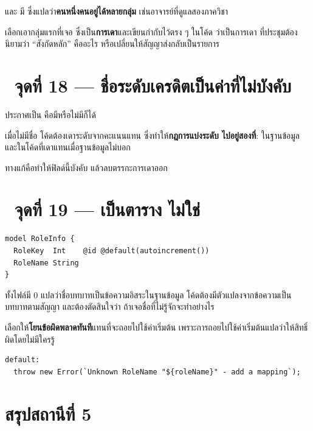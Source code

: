 และ  มี 
ซึ่งแปลว่า\textbf{คนหนึ่งคนอยู่ได้หลายกลุ่ม} เช่นอาจารย์ที่ดูแลสองภาควิชา

 เลือกเอากลุ่มแรกที่เจอ ซึ่งเป็น\textbf{การเดา}และเขียนกำกับไว้ตรง ๆ ในโค้ด
ว่าเป็นการเดา ที่ประชุมต้องนิยามว่า ``สังกัดหลัก'' คืออะไร
หรือเปลี่ยนให้สัญญาส่งกลับเป็นรายการ

\section{\ptwo\ จุดที่ 18 --- ชื่อระดับเครดิตเป็นค่าที่ไม่บังคับ}

 ประกาศเป็น  คือมีหรือไม่มีก็ได้

เมื่อไม่มีชื่อ โค้ดต้องเดาระดับจากคะแนนแทน ซึ่งทำให้\textbf{กฎการแบ่งระดับ
ไปอยู่สองที่}: ในฐานข้อมูล และในโค้ดที่เดาแทนเมื่อฐานข้อมูลไม่บอก

ทางแก้คือทำให้ฟิลด์นี้บังคับ แล้วลบตรรกะการเดาออก

\section{\ptwo\ จุดที่ 19 ---  เป็นตาราง ไม่ใช่ }

\begin{lstlisting}[language={}]
model RoleInfo {
  RoleKey  Int    @id @default(autoincrement())
  RoleName String
}
\end{lstlisting}

 ทั้งไฟล์มี 0  แปลว่าชื่อบทบาทเป็นข้อความอิสระในฐานข้อมูล
โค้ดต้องมีตัวแปลงจากข้อความเป็นบทบาทตามสัญญา และต้องตัดสินใจว่า
ถ้าเจอชื่อที่ไม่รู้จักจะทำอย่างไร

 เลือกให้\textbf{โยนข้อผิดพลาดทันที}แทนที่จะถอยไปใช้ค่าเริ่มต้น
เพราะการถอยไปใช้ค่าเริ่มต้นแปลว่าให้สิทธิ์ผิดโดยไม่มีใครรู้

\begin{lstlisting}
default:
  throw new Error(`Unknown RoleName "${roleName}" - add a mapping`);
\end{lstlisting}

\section{สรุปสถานีที่ 5}

